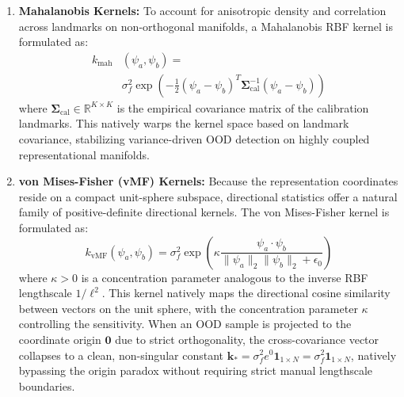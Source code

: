 \begin{enumerate}
\begin{proof}
\begin{equation}
\begin{aligned}
    &\quad - \mathbf{0}^T \mathbf{M} \mathbf{0} \\
    &= \sigma_f^2
    \end{aligned}
    \end{equation}
    This completes the proof.
    \end{proof}
    \item \textbf{Mahalanobis Kernels:} To account for anisotropic density and correlation across landmarks on non-orthogonal manifolds, a Mahalanobis RBF kernel is formulated as:
    \begin{equation}
    \begin{aligned}
    k_{\text{mah}}&(\psi_a, \psi_b) = \\
    &\sigma_f^2 \exp\left( -\frac{1}{2} (\psi_a - \psi_b)^T \mathbf{\Sigma}_{\text{cal}}^{-1} (\psi_a - \psi_b) \right)
    \end{aligned}
    \end{equation}
    where $\mathbf{\Sigma}_{\text{cal}} \in \mathbb{R}^{K \times K}$ is the empirical covariance matrix of the calibration landmarks. This natively warps the kernel space based on landmark covariance, stabilizing variance-driven OOD detection on highly coupled representational manifolds.
    \item \textbf{von Mises-Fisher (vMF) Kernels:} Because the representation coordinates reside on a compact unit-sphere subspace, directional statistics offer a natural family of positive-definite directional kernels. The von Mises-Fisher kernel is formulated as:
    \begin{equation}
    k_{\text{vMF}}(\psi_a, \psi_b) = \sigma_f^2 \exp\left( \kappa \frac{\psi_a \cdot \psi_b}{\|\psi_a\|_2 \|\psi_b\|_2 + \epsilon_0} \right)
    \end{equation}
    where $\kappa > 0$ is a concentration parameter analogous to the inverse RBF lengthscale $1/\ell^2$. This kernel natively maps the directional cosine similarity between vectors on the unit sphere, with the concentration parameter $\kappa$ controlling the sensitivity. When an OOD sample is projected to the coordinate origin $\mathbf{0}$ due to strict orthogonality, the cross-covariance vector collapses to a clean, non-singular constant $\mathbf{k}_* = \sigma_f^2 e^0 \mathbf{1}_{1 \times N} = \sigma_f^2 \mathbf{1}_{1 \times N}$, natively bypassing the origin paradox without requiring strict manual lengthscale boundaries.
\end{enumerate}

